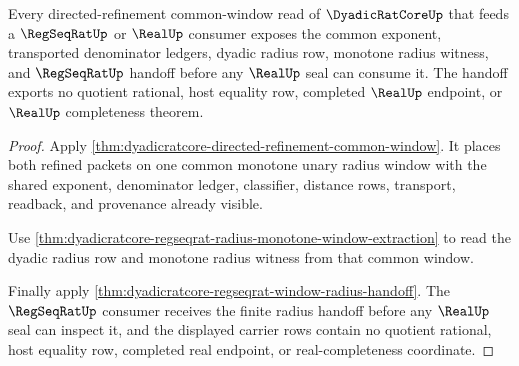\begin{theorem}
\label{thm:dyadicratcore-directed-refinement-radius-handoff}
Every directed-refinement common-window read of $\DyadicRatCoreUp$ that feeds a $\RegSeqRatUp$ or $\RealUp$ consumer exposes the common exponent, transported denominator ledgers, dyadic radius row, monotone radius witness, and $\RegSeqRatUp$ handoff before any $\RealUp$ seal can consume it. The handoff exports no quotient rational, host equality row, completed $\RealUp$ endpoint, or $\RealUp$ completeness theorem.
\end{theorem}
\begin{proof}
Apply \autoref{thm:dyadicratcore-directed-refinement-common-window}. It places both refined packets on one common monotone unary radius window with the shared exponent, denominator ledger, classifier, distance rows, transport, readback, and provenance already visible.

Use \autoref{thm:dyadicratcore-regseqrat-radius-monotone-window-extraction} to read the dyadic radius row and monotone radius witness from that common window.

Finally apply \autoref{thm:dyadicratcore-regseqrat-window-radius-handoff}. The $\RegSeqRatUp$ consumer receives the finite radius handoff before any $\RealUp$ seal can inspect it, and the displayed carrier rows contain no quotient rational, host equality row, completed real endpoint, or real-completeness coordinate.
\end{proof}

